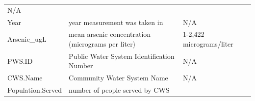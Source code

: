 \documentclass[12pt,]{article}
\begin{document}
\begin{longtable}[]{@{}lll@{}}
\begin{minipage}[t]{0.23\columnwidth}
N/A\strut
\end{minipage}\tabularnewline
\begin{minipage}[t]{0.22\columnwidth}\raggedright
Year\strut
\end{minipage} & \begin{minipage}[t]{0.46\columnwidth}\raggedright
year measurement was taken in\strut
\end{minipage} & \begin{minipage}[t]{0.23\columnwidth}\raggedright
N/A\strut
\end{minipage}\tabularnewline
\begin{minipage}[t]{0.22\columnwidth}\raggedright
Arsenic\_ugL\strut
\end{minipage} & \begin{minipage}[t]{0.46\columnwidth}\raggedright
mean arsenic concentration (micrograms per liter)\strut
\end{minipage} & \begin{minipage}[t]{0.23\columnwidth}\raggedright
1-2,422 micrograms/liter\strut
\end{minipage}\tabularnewline
\begin{minipage}[t]{0.22\columnwidth}\raggedright
PWS.ID\strut
\end{minipage} & \begin{minipage}[t]{0.46\columnwidth}\raggedright
Public Water System Identification Number\strut
\end{minipage} & \begin{minipage}[t]{0.23\columnwidth}\raggedright
N/A\strut
\end{minipage}\tabularnewline
\begin{minipage}[t]{0.22\columnwidth}\raggedright
CWS.Name\strut
\end{minipage} & \begin{minipage}[t]{0.46\columnwidth}\raggedright
Community Water System Name\strut
\end{minipage} & \begin{minipage}[t]{0.23\columnwidth}\raggedright
N/A\strut
\end{minipage}\tabularnewline
\begin{minipage}[t]{0.22\columnwidth}\raggedright
Population.Served\strut
\end{minipage} & \begin{minipage}[t]{0.46\columnwidth}\raggedright
number of people served by CWS\strut
\end{minipage} & \begin{minipage}[t]{0.23\columnwidth}\raggedright

\end{minipage}
\end{longtable}
\end{document}
